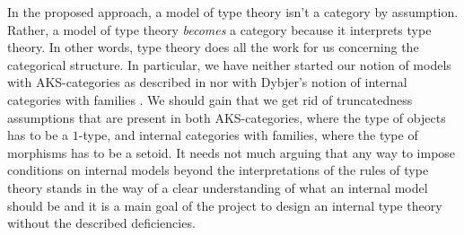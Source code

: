 In the proposed approach, a model of type theory isn't a category by assumption. Rather,
a model of type theory \emph{becomes} a category because it interprets type
theory. In other words, type theory does all the work for us concerning the
categorical structure. In particular, we have neither started our notion of models
with AKS-categories as described in \cite{1categories} nor with Dybjer's notion
of internal categories with families \cite{Dybjer1996}. We should gain that we get rid of
truncatedness assumptions that are present in both AKS-categories, where the
type of objects has to be a $1$-type, and internal categories with families,
where the type of morphisms has to be a setoid. It needs not much arguing that any way to impose
conditions on internal models beyond the interpretations of the rules of
type theory stands in the way of a clear understanding of what an internal
model should be and it is a main goal of the project to design
an internal type theory without the described deficiencies. 

